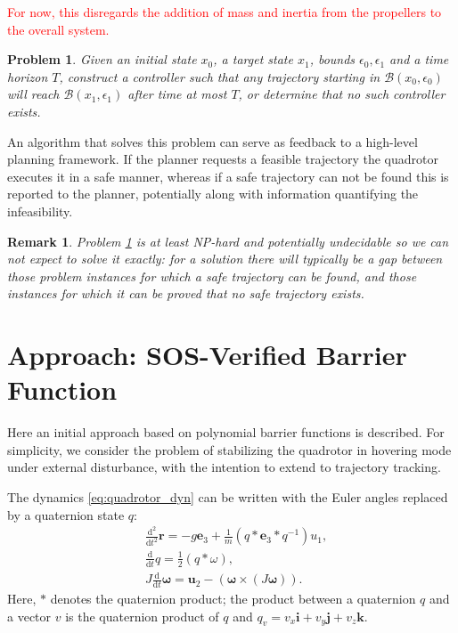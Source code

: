 \documentclass[conference]{IEEEtran}
\newtheorem{problem}{Problem}
\newtheorem{remark}{Remark}
\begin{document}
\textcolor{red}{For now, this disregards the addition of mass and inertia from the propellers to the overall system.}

\begin{problem}
  \label{prob:main}
  Given an initial state $x_0$, a target state $x_1$, bounds $\epsilon_0, \epsilon_1$ and a time horizon $T$, construct a controller such that any trajectory starting in $\mathcal B(x_0, \epsilon_0)$ will reach $\mathcal B(x_1, \epsilon_1)$ after time at most $T$, or determine that no such controller exists.
\end{problem}

An algorithm that solves this problem can serve as feedback to a high-level planning framework. If the planner requests a feasible trajectory the quadrotor executes it in a safe manner, whereas if a safe trajectory can not be found this is reported to the planner, potentially along with information quantifying the infeasibility.

\begin{remark}
  Problem \ref{prob:main} is at least NP-hard and potentially undecidable \cite{Bell2010} so we can not expect to solve it exactly: for a solution there will typically be a gap between those problem instances for which a safe trajectory can be found, and those instances for which it can be proved that no safe trajectory exists. 
\end{remark}

\section{Approach: SOS-Verified Barrier Function}

Here an initial approach based on polynomial barrier functions is described. For simplicity, we consider the problem of stabilizing the quadrotor in hovering mode under external disturbance, with the intention to extend to trajectory tracking.

The dynamics \eqref{eq:quadrotor_dyn} can be written with the Euler angles replaced by a quaternion state $q$:
\begin{equation}
\label{eq:quadrotor_dyn_quat}
\begin{aligned}
  & \frac{\mathrm{d}^2}{\mathrm{d}t^2} \mathbf{r} =  -g \mathbf{e}_3 + \frac{1}{m} (q * \mathbf{e}_3 * q^{-1}) u_1, \\
  & \frac{\mathrm{d}}{\mathrm{d}t} q
   = \frac{1}{2} (q * \omega), \\
  & J \frac{\mathrm{d}}{\mathrm{d}t} \mathbf{\omega} = \mathbf{u}_2 - (\mathbf{\omega} \times (J \mathbf{\omega})).
\end{aligned}
\end{equation}
Here, $*$ denotes the quaternion product; the product between a quaternion $q$ and a vector $v$ is the quaternion product of $q$ and $q_v = v_x \mathbf{i} + v_y \mathbf{j} + v_z \mathbf{k}$.
\end{document}

